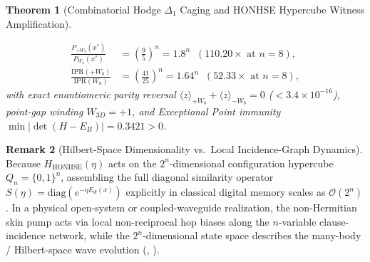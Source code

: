 \documentclass[11pt,a4paper]{article}
\newtheorem{theorem}{Theorem}[section]
\theoremstyle{definition}
\newtheorem{remark}[theorem]{Remark}
\begin{document}
\begin{theorem}[Combinatorial Hodge $\Delta_1$ Caging and HONHSE Hypercube Witness Amplification]
\begin{enumerate}
    \begin{equation}
    \begin{aligned}
    \frac{P_{+W_b}(x^*)}{P_{W_a}(x^*)} &= \left(\frac{9}{5}\right)^n = 1.8^n \;\; (110.20\times \text{ at } n=8), \\
    \frac{\mathrm{IPR}(+W_b)}{\mathrm{IPR}(W_a)} &= \left(\frac{41}{25}\right)^n = 1.64^n \;\; (52.33\times \text{ at } n=8),
    \end{aligned}
    \end{equation}
    with exact enantiomeric parity reversal $\langle z\rangle_{+W_b} + \langle z\rangle_{-W_b} = 0$ ($< 3.4\times 10^{-16}$), point-gap winding $W_{3D} = +1$, and Exceptional Point immunity $\min|\det(H - E_B)| = 0.3421 > 0$.
\end{enumerate}
\end{theorem}

\begin{remark}[Hilbert-Space Dimensionality vs.\ Local Incidence-Graph Dynamics]
Because $H_{\mathrm{HONHSE}}(\eta)$ acts on the $2^n$-dimensional configuration hypercube $Q_n = \{0,1\}^n$, assembling the full diagonal similarity operator $S(\eta) = \mathrm{diag}(e^{-\eta E_\Phi(x)})$ explicitly in classical digital memory scales as $\mathcal{O}(2^n)$. In a physical open-system or coupled-waveguide realization, the non-Hermitian skin pump acts via local non-reciprocal hop biases along the $n$-variable clause-incidence network, while the $2^n$-dimensional state space describes the many-body / Hilbert-space wave evolution (, ).
\end{remark}
\end{document}
